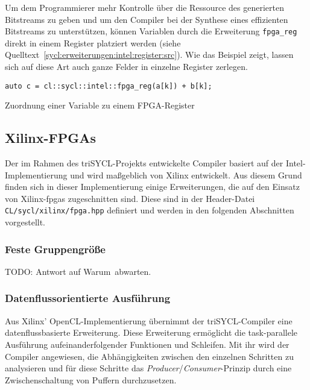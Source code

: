 Um dem Programmierer mehr Kontrolle über die Ressource des generierten
Bitstreams zu geben und um den Compiler bei der Synthese eines effizienten
Bitstreams zu unterstützen, können Variablen durch die Erweiterung
\texttt{fpga\_reg} direkt in einem Register platziert werden (siehe
Quelltext~\ref{sycl:erweiterungen:intel:register:src}). Wie das Beispiel zeigt,
lassen sich auf diese Art auch ganze Felder in einzelne Register zerlegen.

\begin{code}
    \begin{verbatim}
auto c = cl::sycl::intel::fpga_reg(a[k]) + b[k];
    \end{verbatim}
    \caption{Zuordnung einer Variable zu einem FPGA-Register}
    \label{sycl:erweiterungen:intel:register:src}
\end{code}

\subsection{Xilinx-FPGAs}\label{sycl:erweiterungen:xilinx}

Der im Rahmen des triSYCL-Projekts entwickelte Compiler basiert auf der
Intel-Implementierung und wird maßgeblich von Xilinx entwickelt. Aus diesem
Grund finden sich in dieser Implementierung einige Erweiterungen, die auf den
Einsatz von Xilinx-\gls{fpga}s zugeschnitten sind. Diese sind in der
Header-Datei \texttt{CL/sycl/xilinx/fpga.hpp} definiert und werden in den
folgenden Abschnitten vorgestellt.

\subsubsection{Feste Gruppengröße}
\label{sycl:erweiterungen:xilinx:reqd}

TODO: Antwort auf \glqq Warum\grqq\ abwarten.

\subsubsection{Datenflussorientierte Ausführung}
\label{sycl:erweiterungen:xilinx:dataflow}

Aus Xilinx' OpenCL-Implementierung übernimmt der triSYCL-Compiler eine
datenflussbasierte Erweiterung. Diese Erweiterung ermöglicht die task-parallele
Ausführung aufeinanderfolgender Funktionen und Schleifen. Mit ihr wird der
Compiler angewiesen, die Abhängigkeiten zwischen den einzelnen Schritten zu
analysieren und für diese Schritte das
\textit{Producer}/\textit{Consumer}-Prinzip durch eine Zwischenschaltung von
Puffern durchzusetzen. \cite[siehe][70\psqq]{sdaccelopt2019}

